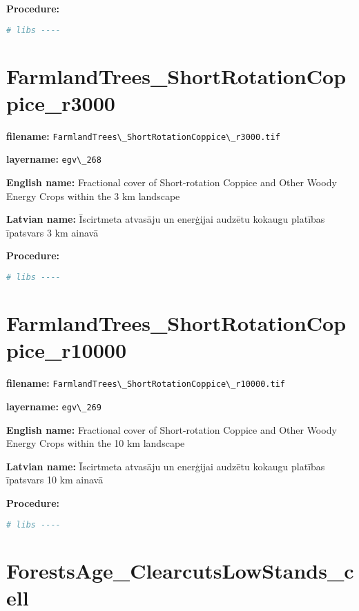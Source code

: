\documentclass[
]{book}
\newcommand{\passthrough}[1]{#1}
\begin{document}
\textbf{Procedure:}

\begin{lstlisting}[language=R]
# libs ----
\end{lstlisting}

\section{FarmlandTrees\_ShortRotationCoppice\_r3000}\label{ch06.268}

\textbf{filename:} \passthrough{\lstinline!FarmlandTrees\_ShortRotationCoppice\_r3000.tif!}

\textbf{layername:} \passthrough{\lstinline!egv\_268!}

\textbf{English name:} Fractional cover of Short-rotation Coppice and Other Woody Energy Crops within the 3 km landscape

\textbf{Latvian name:} Īscirtmeta atvasāju un enerģijai audzētu kokaugu platības īpatsvars 3 km ainavā

\textbf{Procedure:}

\begin{lstlisting}[language=R]
# libs ----
\end{lstlisting}

\section{FarmlandTrees\_ShortRotationCoppice\_r10000}\label{ch06.269}

\textbf{filename:} \passthrough{\lstinline!FarmlandTrees\_ShortRotationCoppice\_r10000.tif!}

\textbf{layername:} \passthrough{\lstinline!egv\_269!}

\textbf{English name:} Fractional cover of Short-rotation Coppice and Other Woody Energy Crops within the 10 km landscape

\textbf{Latvian name:} Īscirtmeta atvasāju un enerģijai audzētu kokaugu platības īpatsvars 10 km ainavā

\textbf{Procedure:}

\begin{lstlisting}[language=R]
# libs ----
\end{lstlisting}

\section{ForestsAge\_ClearcutsLowStands\_cell}\label{ch06.270}
\end{document}
